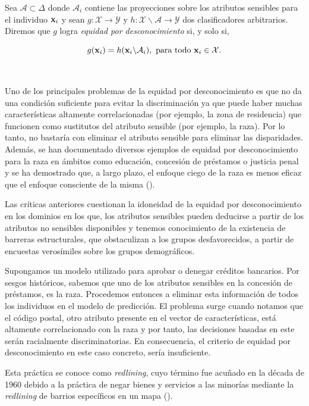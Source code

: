 \documentclass[oneside,openright,titlepage,numbers=noenddot,openany,headinclude,footinclude=true,
cleardoublepage=empty,abstractoff,BCOR=5mm,paper=a4,fontsize=12pt,main=spanish]{scrreprt}
\begin{document}
\begin{definition}
Sea $\mathcal{A} \subset \Delta$ donde $\mathcal{A}_i$ contiene las proyecciones sobre los atributos sensibles para el individuo $\textbf{x}_i$ y sean $g\colon \mathcal{X} \to \mathcal{Y}$ y $h\colon \mathcal{X}\backslash \mathcal{A} \to \mathcal{Y}$ dos clasificadores arbitrarios. Diremos que $g$ logra \textit{equidad por desconocimiento} si, y solo si, 

\begin{equation*} 
g(\textbf{x}_i)=h(\textbf{x}_i \backslash \mathcal{A}_i), \ \text{para todo} \ \textbf{x}_i \in \mathcal{X}.
\end{equation*}
\end{definition}\

Uno de los principales problemas de la equidad por desconocimiento es que no da una condición suficiente para evitar la discriminación ya que puede haber muchas características altamente correlacionadas (por ejemplo, la zona de residencia) que funcionen como sustitutos del atributo sensible (por ejemplo, la raza). Por lo tanto, no bastaría con eliminar el atributo sensible para eliminar las disparidades. Además, se han documentado diversos ejemplos de equidad por desconocimiento para la raza en ámbitos como educación, concesión de préstamos o justicia
penal y se ha demostrado que, a largo plazo, el enfoque ciego de la raza es menos eficaz que el enfoque consciente de la misma (\cite{ceguera2008}).

Las críticas anteriores cuestionan la idoneidad de la
equidad por desconocimiento en los dominios en
los que, los atributos sensibles pueden deducirse a partir de los atributos no sensibles disponibles y tenemos conocimiento de la existencia de barreras estructurales, que obstaculizan a los grupos desfavorecidos, a partir de encuestas verosímiles sobre los grupos demográficos.

\begin{example} \label{ex:redlining}
Supongamos un modelo utilizado para aprobar o denegar créditos bancarios. Por sesgos históricos, sabemos que uno de los atributos sensibles en la concesión de préstamos, es la raza. Procedemos entonces a eliminar esta información de todos los individuos en el modelo de predicción. El problema surge cuando notamos que el código postal, otro atributo presente en el vector de características, está altamente correlacionado con la raza y por tanto, las decisiones basadas en este serán racialmente discriminatorias. En consecuencia, el criterio de equidad por desconocimiento en este caso concreto, sería insuficiente. 

Esta práctica se conoce como \textit{redlining}, cuyo término fue acuñado en la década de 1960 debido a la práctica de negar bienes y servicios a las minorías mediante la \textit{redlining} de barrios específicos en un mapa (\cite{redlining2012}).
\end{example}
\end{document}
